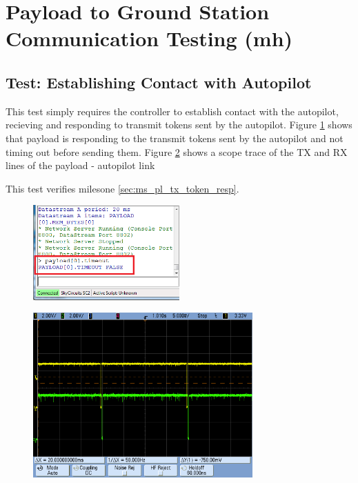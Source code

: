 \section{Payload to Ground Station Communication Testing (mh)}

\subsection{Test: Establishing Contact with Autopilot}
\label{sec:test_pl_est_contact}
This test simply requires the controller to establish contact with the autopilot, recieving and responding to
transmit tokens sent by the autopilot. Figure \ref{fig:pl_comms_timeout_false} shows that payload is responding
to the transmit tokens sent by the autopilot and not timing out before sending them. Figure \ref{fig:transmit_tokens_succ}
shows a scope trace of the TX and RX lines of the payload - autopilot link

This test verifies milesone \ref{sec:ms_pl_tx_token_resp}.

\begin{figure}[H]
        \centering
        \includegraphics[width=0.5\textwidth]{testing_screenshots/timeout_false.png}
        \label{fig:pl_comms_timeout_false}
\end{figure}


\begin{figure}[H]
        \centering
        \includegraphics[width=0.75\textwidth]{testing_screenshots/transmit_tokens_succ.png}
        \label{fig:transmit_tokens_succ}
\end{figure}

